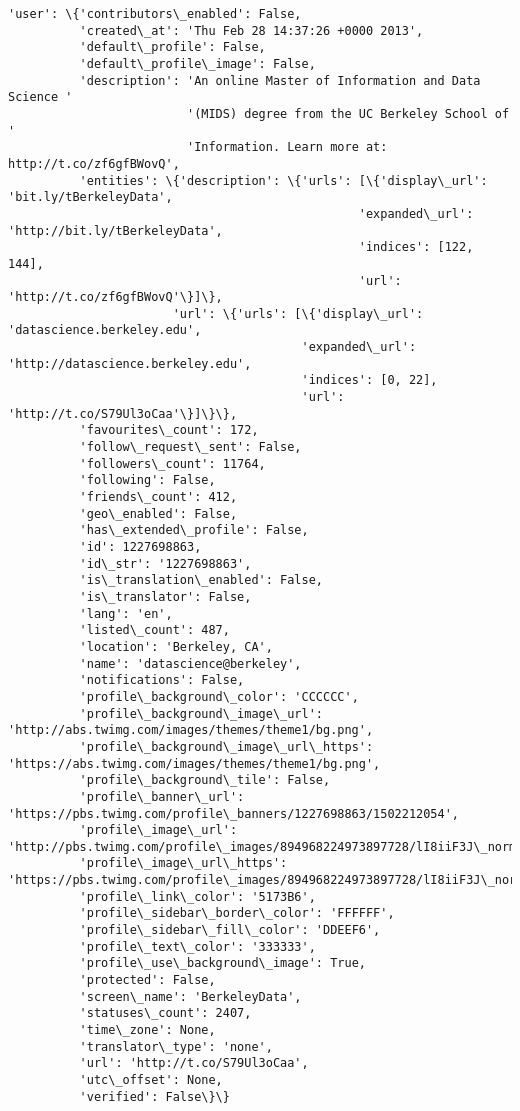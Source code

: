\documentclass[11pt]{article}
\begin{document}
\begin{Verbatim}[commandchars=\\\{\}]
 'user': \{'contributors\_enabled': False,
          'created\_at': 'Thu Feb 28 14:37:26 +0000 2013',
          'default\_profile': False,
          'default\_profile\_image': False,
          'description': 'An online Master of Information and Data Science '
                         '(MIDS) degree from the UC Berkeley School of '
                         'Information. Learn more at: http://t.co/zf6gfBWovQ',
          'entities': \{'description': \{'urls': [\{'display\_url': 'bit.ly/tBerkeleyData',
                                                 'expanded\_url': 'http://bit.ly/tBerkeleyData',
                                                 'indices': [122, 144],
                                                 'url': 'http://t.co/zf6gfBWovQ'\}]\},
                       'url': \{'urls': [\{'display\_url': 'datascience.berkeley.edu',
                                         'expanded\_url': 'http://datascience.berkeley.edu',
                                         'indices': [0, 22],
                                         'url': 'http://t.co/S79Ul3oCaa'\}]\}\},
          'favourites\_count': 172,
          'follow\_request\_sent': False,
          'followers\_count': 11764,
          'following': False,
          'friends\_count': 412,
          'geo\_enabled': False,
          'has\_extended\_profile': False,
          'id': 1227698863,
          'id\_str': '1227698863',
          'is\_translation\_enabled': False,
          'is\_translator': False,
          'lang': 'en',
          'listed\_count': 487,
          'location': 'Berkeley, CA',
          'name': 'datascience@berkeley',
          'notifications': False,
          'profile\_background\_color': 'CCCCCC',
          'profile\_background\_image\_url': 'http://abs.twimg.com/images/themes/theme1/bg.png',
          'profile\_background\_image\_url\_https': 'https://abs.twimg.com/images/themes/theme1/bg.png',
          'profile\_background\_tile': False,
          'profile\_banner\_url': 'https://pbs.twimg.com/profile\_banners/1227698863/1502212054',
          'profile\_image\_url': 'http://pbs.twimg.com/profile\_images/894968224973897728/lI8iiF3J\_normal.jpg',
          'profile\_image\_url\_https': 'https://pbs.twimg.com/profile\_images/894968224973897728/lI8iiF3J\_normal.jpg',
          'profile\_link\_color': '5173B6',
          'profile\_sidebar\_border\_color': 'FFFFFF',
          'profile\_sidebar\_fill\_color': 'DDEEF6',
          'profile\_text\_color': '333333',
          'profile\_use\_background\_image': True,
          'protected': False,
          'screen\_name': 'BerkeleyData',
          'statuses\_count': 2407,
          'time\_zone': None,
          'translator\_type': 'none',
          'url': 'http://t.co/S79Ul3oCaa',
          'utc\_offset': None,
          'verified': False\}\}

    \end{Verbatim}
\end{document}
